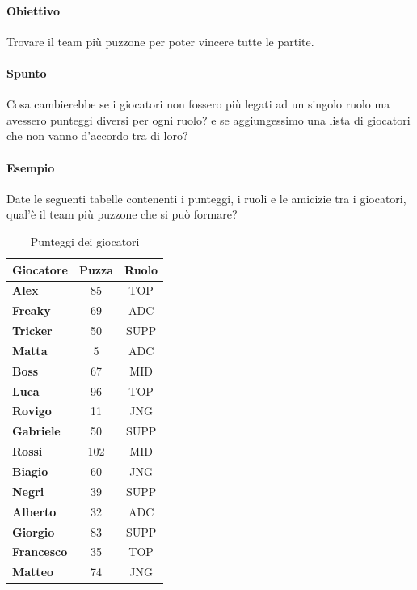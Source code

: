     \paragraph{Obiettivo} Trovare il team più puzzone per poter vincere tutte le partite.
    \paragraph{Spunto} Cosa cambierebbe se i giocatori non fossero più legati ad un singolo ruolo ma avessero punteggi diversi per ogni ruolo? e se aggiungessimo una lista di giocatori che non vanno d'accordo tra di loro?
    \paragraph{Esempio} Date le seguenti tabelle contenenti i punteggi, i ruoli e le amicizie tra i giocatori, qual'è il team più puzzone che si può formare?

    \begin{table}[h!]
        \centering
        \caption{Punteggi dei giocatori}
        \label{tab:punteggi_giocatori}
        \begin{tabular}{|l|c|c|}
        \hline
            \textbf{Giocatore} & \textbf{Puzza} & \textbf{Ruolo} \\ \hline
            \textbf{Alex} & 85 & TOP \\ \hline
            \textbf{Freaky} & 69 & ADC \\ \hline
            \textbf{Tricker} & 50 & SUPP \\ \hline
            \textbf{Matta} & 5 & ADC \\ \hline
            \textbf{Boss} & 67 & MID \\ \hline
            \textbf{Luca} & 96 & TOP \\ \hline
            \textbf{Rovigo} & 11 & JNG \\ \hline
            \textbf{Gabriele} & 50 & SUPP \\ \hline
            \textbf{Rossi} & 102 & MID \\ \hline
            \textbf{Biagio} & 60 & JNG \\ \hline
            \textbf{Negri} & 39 & SUPP \\ \hline
            \textbf{Alberto} & 32 & ADC \\ \hline
            \textbf{Giorgio} & 83 & SUPP \\ \hline
            \textbf{Francesco} & 35 & TOP \\ \hline
            \textbf{Matteo} & 74 & JNG \\ \hline
        \end{tabular}
    \end{table}

